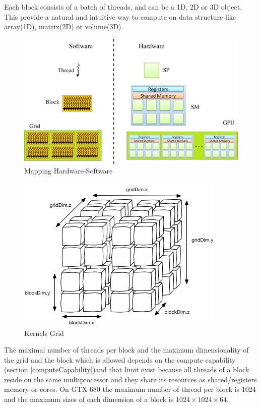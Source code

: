 Each block consists of a batch of threads, and can be a 1D, 2D or 3D object.
This provide a natural and intuitive way to compute on data structure like
array(1D), matrix(2D) or volume(3D).
\begin{figure}
\centering
\includegraphics[scale=1.1]{./images/mappingSofthard}
\caption{Mapping Hardware-Software}\label{mappingSofthard}
\end{figure}

\begin{figure}
\caption{Kernels Grid}\label{kernelGrid}
\includegraphics[scale=0.66]{./images/cuda-grid}
\end{figure}
The maximal number of threads per block and
the maximum dimensionality of the grid and the block which is allowed depends on
the compute capability (section \ref{computeCapability})and that limit exist because all threads of a
block reside on the same multiprocessor and they share its resources as
shared/registers memory or cores. On GTX 680 the maximum number of thread per
block is 1024 and the maximum sizes of each dimension of a block is \begin{math}1024 \times 1024 \times 64\end{math}.

